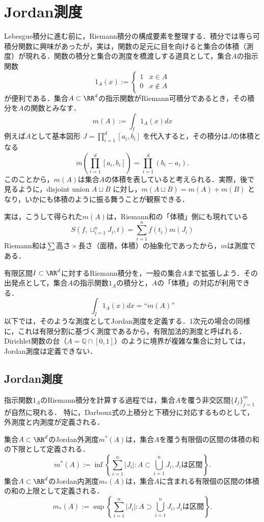 \setcounter{chapter}{1}
\chapter{Jordan測度}

Lebesgue積分に進む前に，Riemann積分の構成要素を整理する．積分では専ら可積分関数に興味があったが，実は，関数の足元に目を向けると集合の体積（測度）が現れる．関数の積分と集合の測度を橋渡しする道具として，集合$A$の指示関数
\[
1_A(x) := \begin{cases}
    1 & x \in A \\
    0 & x \notin A
\end{cases}
\]
が便利である．集合$A \subset \RR^d$の指示関数がRiemann可積分であるとき，その積分を$A$の関数とみなす．
\[
m(A) := \int_I 1_A(x) dx
\]
例えば$A$として基本図形 $J = \prod_{i=1}^d [a_i,b_i]$ を代入すると，その積分は$J$の体積となる
\[
m\left( \prod_{i=1}^d [a_i,b_i] \right) = \prod_{i=1}^d (b_i - a_i).
\]
このことから，$m(A)$は集合$A$の体積を表していると考えられる．実際，後で見るように，disjoint union $A \sqcup B$ に対し，$m( A \sqcup B ) = m(A) +m(B)$ となり，いかにも体積のように振る舞うことが観察できる．

実は，こうして得られた$m(A)$は，Riemann和の「体積」側にも現れている
\[
S\left(f,\sqcup_{i=1}^n J_i,t\right) = \sum_{i=1}^n f(t_i) m(J_i)
\]
Riemann和は$\sum \text{高さ} \times \text{長さ（面積，体積）}$の抽象化であったから，$m$は測度である．

有限区間$I \subset \RR^d$に対するRiemann積分を，一般の集合$A$まで拡張しよう．その出発点として，集合$A$の指示関数$1_A$の積分と，$A$の「体積」の対応が利用できる．
\[
\int_I 1_A(x) dx = \text{``}m(A)\text{''}
\]
以下では，そのような測度としてJordan測度を定義する．1次元の場合の同様に，これは有限分割に基づく測度であるから，有限加法的測度と呼ばれる．Dirichlet関数の台（$A = \mathbb{Q} \cap [0,1]$）のように境界が複雑な集合に対しては，Jordan測度は定義できない．

\section{Jordan測度}%

指示関数$1_A$のRiemann積分を計算する過程では，集合$A$を覆う非交区間$\{I_j\}_{j=1}^m$が自然に現れる．
特に，Darboux式の上積分と下積分に対応するものとして，外測度と内測度が定義される．

\begin{definition}[Jordanの外測度と内測度]
    集合$A \subset \RR^d$のJordan外測度$m^*(A)$は，集合$A$を覆う有限個の区間の体積の和の下限として定義される．
    \[
    m^*(A) := \inf \left\{ \sum_{i=1}^n |J_i| : A \subset \bigcup_{i=1}^n J_i, J_i \text{は区間} \right\}.
    \]
    集合$A \subset \RR^d$のJordan内測度$m_*(A)$は，集合$A$に含まれる有限個の区間の体積の和の上限として定義される．
    \[
    m_*(A) := \sup \left\{ \sum_{i=1}^n |J_i| : A \supset \bigcup_{i=1}^n J_i, J_i \text{は区間} \right\}.
    \]    
\end{definition}

